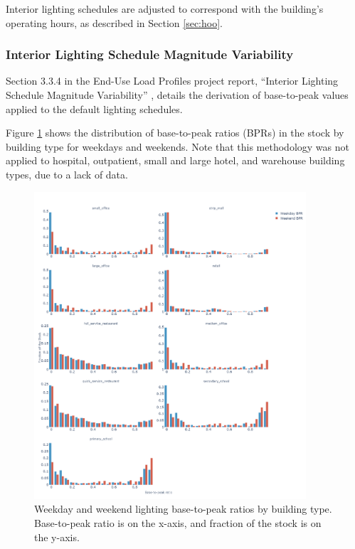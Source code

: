 Interior lighting schedules are adjusted to correspond with the building's operating hours, as described in Section \ref{sec:hoo}.

\subsubsection{Interior Lighting Schedule Magnitude Variability}
Section 3.3.4 in the End-Use Load Profiles project report, ``Interior Lighting Schedule Magnitude Variability'' \citep{eulp_final_report}, details the derivation of base-to-peak values applied to the default lighting schedules.

Figure \ref{fig:ltg_bpr} shows the distribution of base-to-peak ratios (BPRs) in the stock by building type for weekdays and weekends.  Note that this methodology was not applied to hospital, outpatient, small and large hotel, and warehouse building types, due to a lack of data.

\begin{figure}
    \centering \includegraphics[width=0.9\textwidth]{figures/ltg_sch_bpr.png}
    \caption[Weekday and weekend lighting base-to-peak ratios by building type]{Weekday and weekend lighting base-to-peak ratios by building type. Base-to-peak ratio is on the x-axis, and fraction of the stock is on the y-axis.}
    \label{fig:ltg_bpr}
\end{figure}

